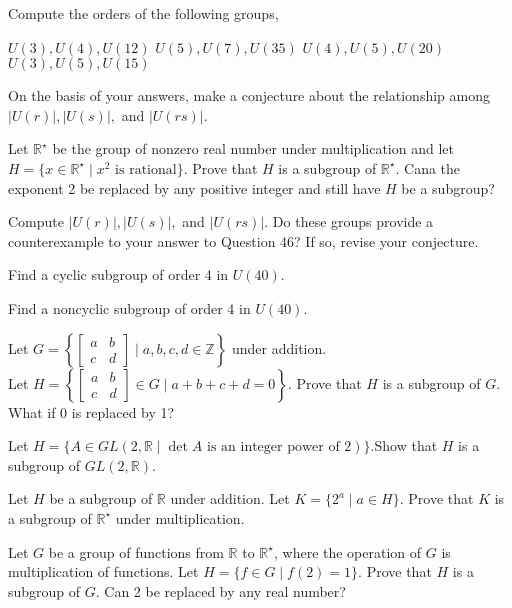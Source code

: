 \documentclass[11pt,largemargins]{homework}
\begin{document}
\question
Compute the orders of the following groups,
\begin{alphaparts}
    \questionpart
    $U(3),U(4),U(12)$
    \questionpart
    $U(5),U(7),U(35)$
    \questionpart
    $U(4),U(5),U(20)$
    \questionpart
    $U(3),U(5),U(15)$
\end{alphaparts}
On the basis of your answers, make a conjecture about the relationship among $|U(r)|,|U(s)|,$ and $|U(rs)|$.

\question
Let $\mathbb{R}^\star$ be the group of nonzero real number under multiplication and let 
$H=\{x\in\mathbb{R}^\star \;|\;x^2 \text{ is rational}\}$. Prove that $H$ is a subgroup of $\mathbb{R}^\star$.
Cana the exponent 2 be replaced by any positive integer and still have $H$ be a subgroup?

\question
Compute $|U(r)|,|U(s)|,$ and $|U(rs)|$. Do these groups provide a counterexample to your answer to Question 46?
If so, revise your conjecture.

\question
Find a cyclic subgroup of order 4 in $U(40)$.

\question
Find a noncyclic subgroup of order 4 in $U(40)$.

\question
Let $G=\left\{\begin{bmatrix} a & b \\ c & d \end{bmatrix} \;|\;a,b,c,d \in \mathbb{Z} \right\}$ under addition.\\
Let $H=\left\{\begin{bmatrix} a & b \\ c & d \end{bmatrix} \in G\;|\;a+b+c+d=0 \right\}$. Prove that $H$ is a subgroup of $G$.
What if 0 is replaced by 1?

\question
Let $H=\{A\in GL(2,\mathbb{R} \;|\; \det A\text{ is an integer power of 2})\}$.Show that $H$ is a subgroup of 
$GL(2, \mathbb{R})$.

\question
Let $H$ be a subgroup of $\mathbb{R}$ under addition. Let $K=\{2^a\;|\;a\in H\}$. Prove that $K$ is a subgroup of 
$\mathbb{R}^\star$ under multiplication.

\question
Let $G$ be a group of functions from $\mathbb{R}$ to $\mathbb{R}^\star$, where the operation of $G$ is multiplication 
of functions. Let $H=\{f\in G\;|\; f(2)=1\}$. Prove that $H$ is a subgroup of $G$. Can 2 be replaced by any real number?
\end{document}
